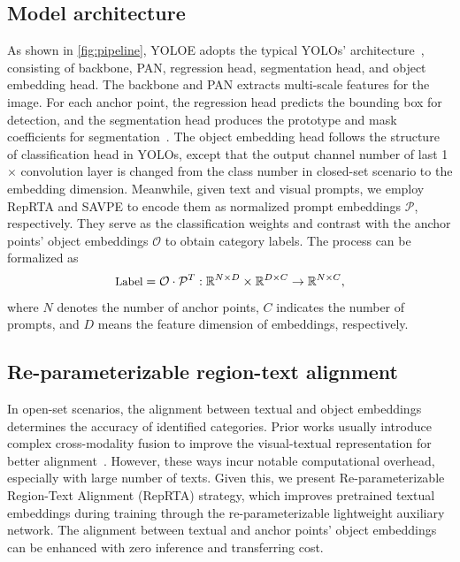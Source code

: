 \documentclass[10pt,twocolumn,letterpaper]{article}
\begin{document}
\subsection{Model architecture}
\label{sec:architecture}
As shown in \cref{fig:pipeline}, YOLOE adopts the typical YOLOs' architecture~\cite{redmon2016you,bochkovskiy2020yolov4,jocherultralytics}, consisting of backbone, PAN, regression head, segmentation head, and object embedding head. The backbone and PAN extracts multi-scale features for the image. For each anchor point, the regression head predicts the bounding box for detection, and the segmentation head produces the prototype and mask coefficients for segmentation~\cite{bolya2019yolact}. The object embedding head follows the structure of classification head in YOLOs, except that the output channel number of last 1$\times$ convolution layer is changed from the class number in closed-set scenario to the embedding dimension. Meanwhile, given text and visual prompts, we employ RepRTA and SAVPE to encode them as normalized prompt embeddings $\mathcal{P}$, respectively. They serve as the classification weights and contrast with the anchor points' object embeddings $\mathcal{O}$ to obtain category labels. The process can be formalized as
\begin{equation}
    \small
    \setlength{\abovedisplayskip}{5pt}
    \setlength{\belowdisplayskip}{5pt}
    \text{Label} = \mathcal{O} \cdot \mathcal{P}^T: \mathbb{R}^{N\times D} \times \mathbb{R}^{D \times C} \rightarrow \mathbb{R}^{N \times C},
\end{equation} where $N$ denotes the number of anchor points, $C$ indicates the number of prompts, and $D$ means the feature dimension of embeddings, respectively. 

\subsection{Re-parameterizable region-text alignment}
\label{sec:reprta}
In open-set scenarios, the alignment between textual and object embeddings determines the accuracy of identified categories. Prior works usually introduce complex cross-modality fusion to improve the visual-textual representation for better alignment~\cite{cheng2024yoloworld,liu2024gdino}. However, these ways incur notable computational overhead, especially with large number of texts. Given this, we present Re-parameterizable Region-Text Alignment (RepRTA) strategy, which improves pretrained textual embeddings during training through the re-parameterizable lightweight auxiliary network. The alignment between textual and anchor points' object embeddings can be enhanced with zero inference and transferring cost.
\end{document}
